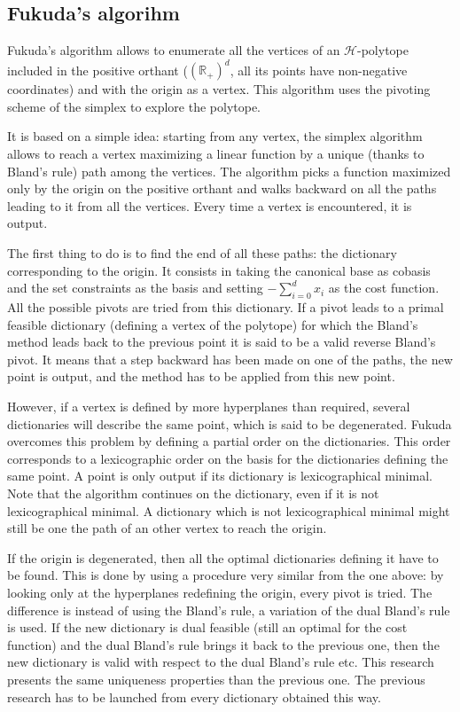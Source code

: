 \subsection{Fukuda's algorihm}

Fukuda's algorithm allows to enumerate all the vertices of an $\mathcal{H}$-polytope included in the positive orthant ($(\mathbb{R}_+)^d$, all its points have non-negative coordinates) and with the origin as a vertex. This algorithm uses the pivoting scheme of the simplex to explore the polytope. 

It is based on a simple idea: starting from any vertex, the simplex algorithm allows to reach a vertex maximizing a linear function by a unique (thanks to Bland's rule) path among the vertices. The algorithm picks a function maximized only by the origin on the positive orthant and walks backward on all the paths leading to it from all the vertices. Every time a vertex is encountered, it is output.

The first thing to do is to find the end of all these paths: the dictionary corresponding to the origin. It consists in taking the canonical base as cobasis and the set constraints as the basis and setting $-\sum_{i=0}^d x_i$ as the cost function. All the possible pivots are tried from this dictionary. If a pivot leads to a primal feasible dictionary (defining a vertex of the polytope) for which the Bland's method leads back to the previous point it is said to be a valid reverse Bland's pivot. It means that a step backward has been made on one of the paths, the new point is output, and the method has to be applied from this new point.

However, if a vertex is defined by more hyperplanes than required, several dictionaries will describe the same point, which is said to be degenerated. Fukuda overcomes this problem by defining a partial order on the dictionaries. This order corresponds to a lexicographic order on the basis for the dictionaries defining the same point. A point is only output if its dictionary is lexicographical minimal. Note that the algorithm continues on the dictionary, even if it is not lexicographical minimal. A dictionary which is not lexicographical minimal might still be one the path of an other vertex to reach the origin.


If the origin is degenerated, then all the optimal dictionaries defining it have to be found. This is done by using a procedure very similar from the one above: by looking only at the hyperplanes redefining the origin, every pivot is tried. The difference is instead of using the Bland's rule, a variation of the dual Bland's rule is used. If the new dictionary is dual feasible (still an optimal for the cost function) and the dual Bland's rule brings it back to the previous one, then the new dictionary is valid with respect to the dual Bland's rule etc. This research presents the same uniqueness properties than the previous one. The previous research has to be launched from every dictionary obtained this way.

